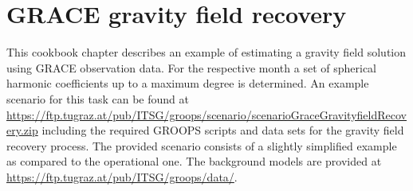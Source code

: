 \section{GRACE gravity field recovery}\label{cookbook.gravityFieldGrace}
This cookbook chapter describes an example of estimating a gravity field solution using GRACE observation
data. For the respective month a set of spherical harmonic coefficients up to a maximum degree is determined.
An example scenario for this task can be found at
\url{https://ftp.tugraz.at/pub/ITSG/groops/scenario/scenarioGraceGravityfieldRecovery.zip}
including the required GROOPS scripts and data sets for the gravity field recovery process.
The provided scenario consists of a slightly simplified example as compared to the operational one.
The background models are provided at \url{https://ftp.tugraz.at/pub/ITSG/groops/data/}.


